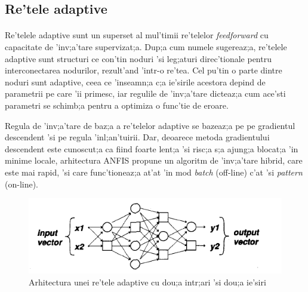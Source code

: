 \subsection{Re'tele adaptive}
\par \paragraph{}
Re'telele adaptive sunt un superset al mul'timii re'telelor \textit{feedforward} cu capacitate de 'inv;a'tare supervizat;a. Dup;a cum numele sugereaz;a, re'telele adaptive sunt structuri ce con'tin noduri 'si leg;aturi direc'tionale pentru interconectarea nodurilor, rezult'and 'intr-o re'tea. Cel pu'tin o parte dintre noduri sunt adaptive, ceea ce 'inseamn;a c;a ie'sirile acestora depind de parametrii pe care 'ii primesc, iar regulile de 'inv;a'tare dicteaz;a cum ace'sti parametri se schimb;a pentru a optimiza o func'tie de eroare.
\par
Regula de 'inv;a'tare de baz;a a re'telelor adaptive se bazeaz;a pe pe gradientul descendent 'si pe regula 'inl;an'tuirii. Dar, deoarece metoda gradientului descendent este cunoscut;a ca fiind foarte lent;a 'si risc;a s;a ajung;a blocat;a 'in minime locale, arhitectura ANFIS propune un algoritm de 'inv;a'tare hibrid, care este mai rapid, 'si care func'tioneaz;a at'at 'in mod \textit{batch} (off-line) c'at 'si \textit{pattern} (on-line).
\begin{figure}[!htbp]
\includegraphics[width=\textwidth]{adaptive_net}
\caption {Arhitectura unei re'tele adaptive cu dou;a intr;ari 'si dou;a ie'siri}
\end{figure}
\newpage

\paragraph{}

